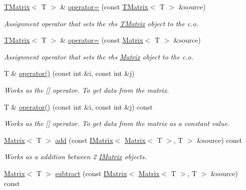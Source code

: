 \begin{DoxyCompactItemize}
\mbox{\hyperlink{class_t_matrix}{T\+Matrix}}$<$ T $>$ \& \mbox{\hyperlink{class_t_matrix_a47aaa864a06bdc4c24608b33a353f873}{operator=}} (const \mbox{\hyperlink{class_t_matrix}{T\+Matrix}}$<$ T $>$ \&source)
\begin{DoxyCompactList}\small\item\em Assignment operator that sets the rhs \mbox{\hyperlink{class_t_matrix}{T\+Matrix}} object to the c.\+o. \end{DoxyCompactList}\item 
\mbox{\hyperlink{class_t_matrix}{T\+Matrix}}$<$ T $>$ \& \mbox{\hyperlink{class_t_matrix_a549cf0f446ec9c6257f4c3f952b2550a}{operator=}} (const \mbox{\hyperlink{class_matrix}{Matrix}}$<$ T $>$ \&source)
\begin{DoxyCompactList}\small\item\em Assignment operator that sets the rhs \mbox{\hyperlink{class_matrix}{Matrix}} object to the c.\+o. \end{DoxyCompactList}\item 
T \& \mbox{\hyperlink{class_t_matrix_a4fa62998b2fe8babbc78f80c230fca45}{operator()}} (const int \&i, const int \&j)
\begin{DoxyCompactList}\small\item\em Works as the \mbox{[}\mbox{]} operator. To get data from the matrix. \end{DoxyCompactList}\item 
T \& \mbox{\hyperlink{class_t_matrix_a62d9e930e95fd666993afe0c8da1ffa2}{operator()}} (const int \&i, const int \&j) const
\begin{DoxyCompactList}\small\item\em Works as the \mbox{[}\mbox{]} operator. To get data from the matrix as a constant value. \end{DoxyCompactList}\item 
\mbox{\hyperlink{class_matrix}{Matrix}}$<$ T $>$ \mbox{\hyperlink{class_t_matrix_a42bd72d405febbf7edcc225a79935800}{add}} (const \mbox{\hyperlink{class_i_matrix}{I\+Matrix}}$<$ \mbox{\hyperlink{class_matrix}{Matrix}}$<$ T $>$, T $>$ \&source) const
\begin{DoxyCompactList}\small\item\em Works as a addition between 2 \mbox{\hyperlink{class_i_matrix}{I\+Matrix}} objects. \end{DoxyCompactList}\item 
\mbox{\hyperlink{class_matrix}{Matrix}}$<$ T $>$ \mbox{\hyperlink{class_t_matrix_ae9cbcbaa97ed98b315d59f0d7dce7fd8}{subtract}} (const \mbox{\hyperlink{class_i_matrix}{I\+Matrix}}$<$ \mbox{\hyperlink{class_matrix}{Matrix}}$<$ T $>$, T $>$ \&source) const

\end{DoxyCompactItemize}
